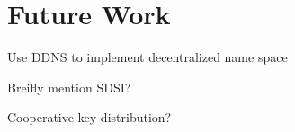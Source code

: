 \section{Future Work}

Use DDNS to implement decentralized name space

Breifly mention SDSI?

Cooperative key distribution?